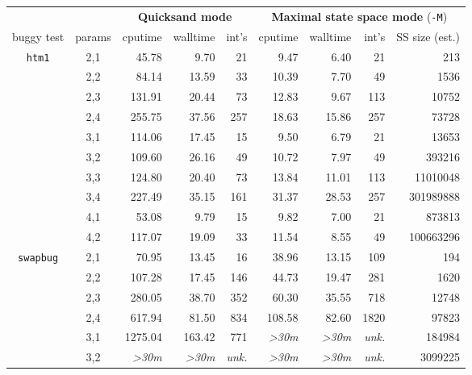 \documentclass[10pt]{sigplanconf}
\begin{document}
\begin{table}[t]
	\begin{center}
	\begin{tabular}{cc||r|r|r||r|r|r|r}
			&	&\multicolumn{3}{c||}{\bf Quicksand mode}&\multicolumn{4}{c}{{\bf Maximal state space mode} ({\tt -M})} \\
		buggy test	& params&cputime&walltime&int's&cputime&walltime&int's& SS size (est.) \\
		\hline
		\hline
		{\tt htm1}
			& 2,1	& 45.78	& 9.70	& 21	& 9.47	& 6.40	& 21	& 213 \\
			& 2,2	& 84.14	& 13.59	& 33	& 10.39	& 7.70	& 49	& 1536 \\
			& 2,3	& 131.91& 20.44	& 73	& 12.83	& 9.67	& 113	& 10752 \\
			& 2,4	& 255.75& 37.56	& 257	& 18.63	& 15.86	& 257	& 73728 \\
		\cline{2-9}
			& 3,1	& 114.06& 17.45	& 15	& 9.50	& 6.79	& 21	& 13653 \\
			& 3,2	& 109.60& 26.16	& 49	& 10.72	& 7.97	& 49	& 393216 \\
			& 3,3	& 124.80& 20.40	& 73	& 13.84	& 11.01	& 113	& 11010048 \\
			& 3,4	& 227.49& 35.15	& 161	& 31.37	& 28.53	& 257	& 301989888 \\
		\cline{2-9}
			& 4,1	& 53.08	& 9.79	& 15	& 9.82	& 7.00	& 21	& 873813 \\
			& 4,2	&117.07	& 19.09	& 33	& 11.54	& 8.55	& 49	& 100663296 \\
		\hline
		{\tt swapbug}
			& 2,1	& 70.95	& 13.45	& 16	& 38.96	& 13.15	& 109	& 194 \\
			& 2,2	& 107.28& 17.45	& 146	& 44.73	& 19.47	& 281	& 1620 \\
			& 2,3	& 280.05& 38.70	& 352	& 60.30	& 35.55	& 718	& 12748 \\
			& 2,4	& 617.94& 81.50	& 834	& 108.58& 82.60	& 1820	& 97823 \\
		\cline{2-9}
			& 3,1	&1275.04& 163.42& 771	&{\em >30m}&{\em >30m}&{\em unk.}& 184984 \\
			& 3,2	&{\em >30m}&{\em >30m}&{\em unk.}&{\em >30m}&{\em >30m}&{\em unk.}& 3099225 \\

\end{tabular}
\end{center}
\end{table}
\end{document}
